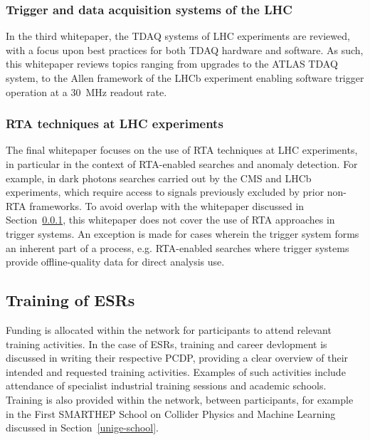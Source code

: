 \subsubsection{Trigger and data acquisition systems of the LHC}
\label{wp-TDAQ-at-LHC}
In the third whitepaper, the TDAQ systems of LHC experiments are reviewed, with a focus upon best practices for both TDAQ hardware and software. As such, this whitepaper reviews topics ranging from upgrades to the ATLAS TDAQ system, to the Allen framework of the LHCb experiment enabling software trigger operation at a 30~MHz readout rate. \cite{ATLAS-TDAQ, LHCb-Allen}

\subsubsection{RTA techniques at LHC experiments}
\label{wp-RTA-at-LHC}
The final whitepaper focuses on the use of RTA techniques at LHC experiments, in particular in the context of RTA-enabled searches and anomaly detection. For example, in dark photons searches carried out by the CMS and LHCb experiments, which require access to signals previously excluded by prior non-RTA frameworks. \cite{CMS-dark-photon, LHCb-dark-photon} To avoid overlap with the whitepaper discussed in Section~\ref{wp-TDAQ-at-LHC}, this whitepaper does not cover the use of RTA approaches in trigger systems. An exception is made for cases wherein the trigger system forms an inherent part of a process, e.g. RTA-enabled searches where trigger systems provide offline-quality data for direct analysis use. 


\subsection{Training of ESRs}
\label{training}
Funding is allocated within the network for participants to attend relevant training activities. In the case of ESRs, training and career devlopment is discussed in writing their respective PCDP, providing a clear overview of their intended and requested training activities. Examples of such activities include attendance of specialist industrial training sessions and academic schools. Training is also provided within the network, between participants, for example in the First SMARTHEP School on Collider Physics and Machine Learning discussed in Section~\ref{unige-school}.

